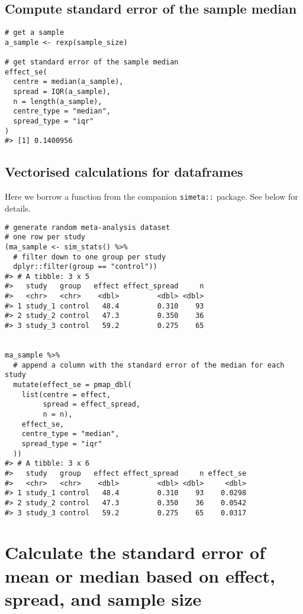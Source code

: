 \documentclass[
]{article}
\begin{document}
\hypertarget{compute-standard-error-of-the-sample-median}{%
\subsection{Compute standard error of the sample
median}\label{compute-standard-error-of-the-sample-median}}

\begin{verbatim}
# get a sample
a_sample <- rexp(sample_size)

# get standard error of the sample median
effect_se(
  centre = median(a_sample),
  spread = IQR(a_sample),
  n = length(a_sample),
  centre_type = "median",
  spread_type = "iqr"
)
#> [1] 0.1400956
\end{verbatim}

\hypertarget{vectorised-calculations-for-dataframes}{%
\subsection{Vectorised calculations for
dataframes}\label{vectorised-calculations-for-dataframes}}

Here we borrow a function from the companion \texttt{simeta::} package.
See below for details.

\begin{verbatim}
# generate random meta-analysis dataset
# one row per study
(ma_sample <- sim_stats() %>%
  # filter down to one group per study
  dplyr::filter(group == "control"))
#> # A tibble: 3 x 5
#>   study   group   effect effect_spread     n
#>   <chr>   <chr>    <dbl>         <dbl> <dbl>
#> 1 study_1 control   48.4         0.310    93
#> 2 study_2 control   47.3         0.350    36
#> 3 study_3 control   59.2         0.275    65


ma_sample %>%
  # append a column with the standard error of the median for each study
  mutate(effect_se = pmap_dbl(
    list(centre = effect,
         spread = effect_spread,
         n = n),
    effect_se,
    centre_type = "median",
    spread_type = "iqr"
  ))
#> # A tibble: 3 x 6
#>   study   group   effect effect_spread     n effect_se
#>   <chr>   <chr>    <dbl>         <dbl> <dbl>     <dbl>
#> 1 study_1 control   48.4         0.310    93    0.0298
#> 2 study_2 control   47.3         0.350    36    0.0542
#> 3 study_3 control   59.2         0.275    65    0.0317
\end{verbatim}

\hypertarget{calculate-the-standard-error-of-mean-or-median-based-on-effect-spread-and-sample-size}{%
\section{Calculate the standard error of mean or median based on effect,
spread, and sample
size}\label{calculate-the-standard-error-of-mean-or-median-based-on-effect-spread-and-sample-size}}
\end{document}
